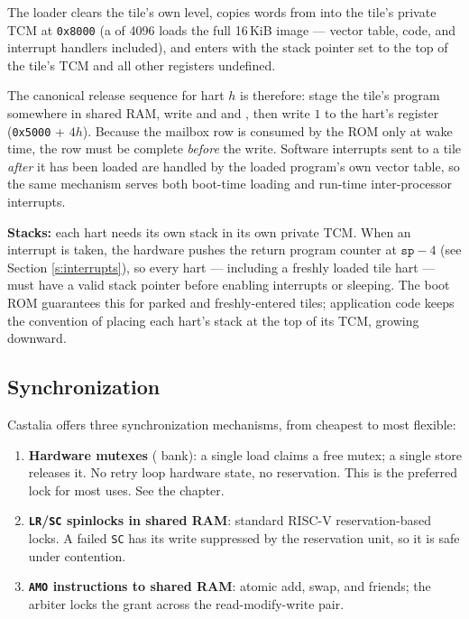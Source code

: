 The loader clears the tile's own  level, copies  words from  into the tile's private TCM at \texttt{0x8000} (a  of 4096 loads the full 16\,KiB image --- vector table, code, and interrupt handlers included), and enters  with the stack pointer set to the top of the tile's TCM and all other registers undefined.

The canonical release sequence for hart $h$ is therefore: stage the tile's program somewhere in shared RAM, write  and  and , then write $1$ to the hart's  register (\texttt{0x5000} + $4h$). Because the mailbox row is consumed by the ROM only at wake time, the row must be complete \textit{before} the  write. Software interrupts sent to a tile \textit{after} it has been loaded are handled by the loaded program's own vector table, so the same  mechanism serves both boot-time loading and run-time inter-processor interrupts.

\textbf{Stacks:} each hart needs its own stack in its own private TCM. When an interrupt is taken, the hardware pushes the return program counter at $\mathtt{sp}-4$ (see Section \ref{s:interrupts}), so every hart --- including a freshly loaded tile hart --- must have a valid stack pointer before enabling interrupts or sleeping. The boot ROM guarantees this for parked and freshly-entered tiles; application code keeps the convention of placing each hart's stack at the top of its TCM, growing downward.



\subsection{Synchronization} \label{ss:multicore-sync}

Castalia offers three synchronization mechanisms, from cheapest to most flexible:

\begin{enumerate}
	\item \textbf{Hardware mutexes} ( bank): a single load claims a free mutex; a single store releases it. No retry loop hardware state, no reservation. This is the preferred lock for most uses. See the  chapter.
	\item \textbf{\texttt{LR}/\texttt{SC} spinlocks in shared RAM}: standard RISC-V reservation-based locks. A failed \texttt{SC} has its write suppressed by the reservation unit, so it is safe under contention.
	\item \textbf{\texttt{AMO} instructions to shared RAM}: atomic add, swap, and friends; the arbiter locks the grant across the read-modify-write pair.
\end{enumerate}

